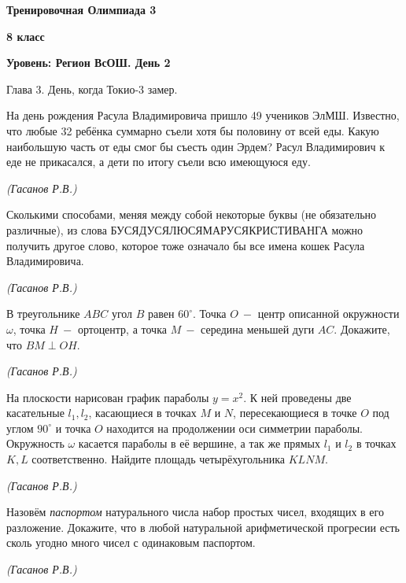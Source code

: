 \centerline{\Huge \bf  Тренировочная Олимпиада 3}
\centerline{\Huge \bf 8 класс}
\centerline{\Huge \bf Уровень: Регион ВсОШ. День 2}


\begin{flushright}
    \scriptsize{Глава 3. День, когда Токио-3 замер.}
\end{flushright}


На день рождения Расула Владимировича пришло 49 учеников ЭлМШ. Известно, что любые 32 ребёнка суммарно съели хотя бы половину от всей еды. Какую наибольшую часть от еды смог бы съесть один Эрдем? Расул Владимирович к еде не прикасался, а дети по итогу съели всю имеющуюся еду.
\begin{flushright}
    \textit{\small{(Гасанов Р.В.)}}
\end{flushright}

Сколькими способами, меняя между собой некоторые буквы (не обязательно различные), из слова БУСЯДУСЯЛЮСЯМАРУСЯКРИСТИВАНГА можно получить другое слово, которое тоже означало бы все имена кошек Расула Владимировича.
\begin{flushright}
    \textit{\small{(Гасанов Р.В.)}}
\end{flushright}

В треугольнике $ABC$ угол $B$ равен $60^\circ$. Точка $O \ -$ центр описанной окружности $\omega$, точка $H \ -$ ортоцентр, а точка $M \ -$ середина меньшей дуги $AC.$ Докажите, что $BM \perp OH.$  
\begin{flushright}
    \textit{\small{(Гасанов Р.В.)}}
\end{flushright}

На плоскости нарисован график параболы $y = x^2$. К ней проведены две касательные $l_1, l_2$, касающиеся в точках $M$ и $N$, пересекающиеся в точке $O$ под углом $90^{\circ}$ и точка $O$ находится на продолжении оси симметрии параболы. Окружность $\omega$ касается параболы в её вершине, а так же  
прямых $l_1$ и $l_2$ в точках $K, L$ соответственно. Найдите площадь четырёхугольника $KLNM.$
\begin{flushright}
    \textit{\small{(Гасанов Р.В.)}}
\end{flushright}

Назовём \textit{паспортом} натурального числа набор простых чисел, входящих в его разложение. Докажите, что в любой натуральной арифметической прогресии есть сколь угодно много чисел с одинаковым паспортом.
\begin{flushright}
    \textit{\small{(Гасанов Р.В.)}}
\end{flushright}

